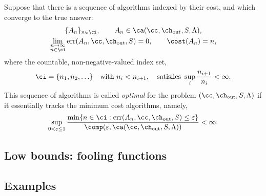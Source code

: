 \documentclass[final]{elsarticle}
\newcommand{\chout}{\ch_{\text{\rm{out}}}}
\DeclareMathOperator{\err}{err}
\theoremstyle{definition}
\theoremstyle{remark}
\begin{document}
Suppose that there is a sequence of algorithms indexed by their cost, and which converge to the true answer:
\begin{subequations} \label{algseqdef}
\begin{gather}
\{A_n\}_{n \in \ci}, \qquad A_n  \in \ca(\cc,\chout,S,\Lambda), \\
\lim_{\substack{n \to \infty\\ n \in \ci}} \err(A_n,\cc,\chout,S) = 0, \qquad \cost(A_n) = n,
\end{gather}
\end{subequations}
where the countable, non-negative-valued index set,
\begin{equation} \label{indexdef}
\ci=\{n_1, n_2, \ldots\} \quad \text{with } n_i < n_{i+1}, \quad \text{satisfies } \sup_i \frac{n_{i+1}}{n_i} <\infty.
\end{equation}
This sequence of algorithms is called \emph{optimal} for the problem $(\cc,\chout,S,\Lambda)$ if it essentially tracks the minimum cost algorithms, namely,
\begin{equation} \label{nearoptdef}
\sup_{0 < \varepsilon \le 1} \frac{\min\{n \in \ci : \err(A_n,\cc,\chout,S) \le \varepsilon\}} {\comp(\varepsilon,\ca(\cc,\chout,S,\Lambda))} <\infty.
\end{equation}

\subsection{Low bounds: fooling functions}

\subsection{Examples}



\end{document}

